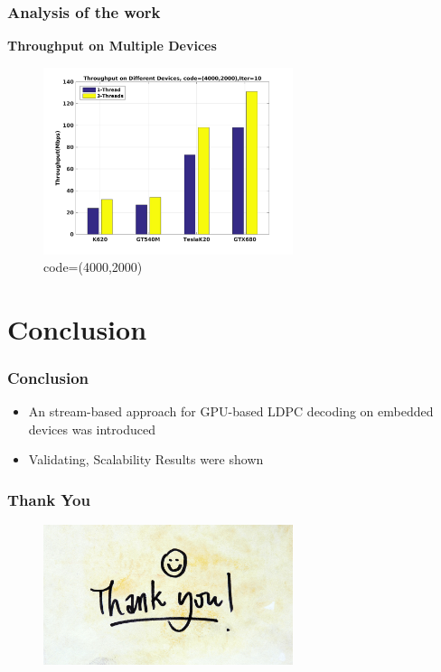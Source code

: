 \documentclass{beamer}
\begin{document}
  \begin{frame}
  \frametitle{Analysis of the work}
  \textbf{Throughput on Multiple Devices}
    \begin{figure}
    \includegraphics[width=0.65\textwidth]{img/c_4k_10.jpg}
    \caption{code=(4000,2000)}
  \end{figure}
  \end{frame}
  
\section{Conclusion}

\begin{frame}
  \frametitle{Conclusion}
  \begin{itemize}
  \item An stream-based approach for GPU-based LDPC decoding on embedded devices was introduced 
  \item Validating, Scalability Results were shown
  \end{itemize}

\end{frame}

\begin{frame}
  \frametitle{Thank You}
  \begin{figure}
    \includegraphics[width=0.65\textwidth]{img/thank-you.jpg}
  \end{figure}

\end{frame}
\end{document}
